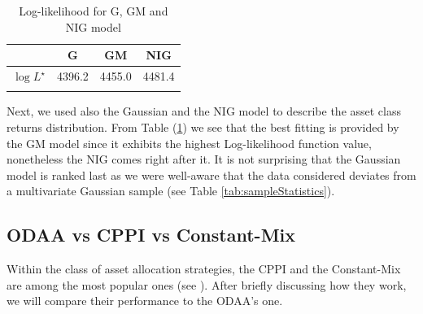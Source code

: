\begin{table}[]
	\centering
	\begin{tabular}{@{}*{4}{c}@{}}
		\toprule
		& G & GM & NIG \\
		\midrule	
		$\log L^{\star}$ & 4396.2& 4455.0  & 4481.4\\
		\addlinespace[0.5em]	
		\bottomrule
	\end{tabular}
	\caption{Log-likelihood for G, GM and NIG model}
	\label{tab:LogL_models}
\end{table}

Next, we used also the Gaussian and the NIG model to describe the asset class returns distribution. From Table (\ref{tab:LogL_models}) we see that the best fitting is provided by the GM model since it exhibits the highest Log-likelihood function value, nonetheless the NIG comes right after it. It is not surprising that the Gaussian model is ranked last as we were well-aware that the data considered deviates from a multivariate Gaussian sample (see Table \ref{tab:sampleStatistics}).


\subsection{ODAA vs CPPI vs Constant-Mix}
Within the class of asset allocation strategies, the \gls{CPPI} and the Constant-Mix are among the most popular ones (see \cite{Perold1988}). After briefly discussing how they work, we will compare their performance to the ODAA's one.
